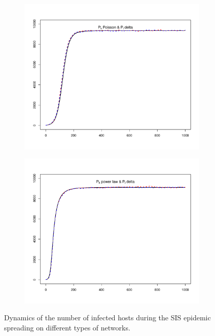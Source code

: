 \begin{figure}[hbtp]
\begin{subfigure}[b]{0.45\textwidth}
    \end{subfigure}
    \newline
    \begin{subfigure}[b]{0.45\textwidth}
        \centering
        \includegraphics[width=\textwidth, trim=30 20 30 20, clip]{../img/sis_02.pdf}
    \end{subfigure}
    \hspace{0.08\textwidth}
    \begin{subfigure}[b]{0.45\textwidth}
        \centering
        \includegraphics[width=\textwidth, trim=30 20 30 20, clip]{../img/sis_12.pdf}
    \end{subfigure}
    \newline
    \caption{Dynamics of the number of infected hosts during the SIS epidemic spreading on different types of networks.}
    \label{fig:sis_plots}
\end{figure}